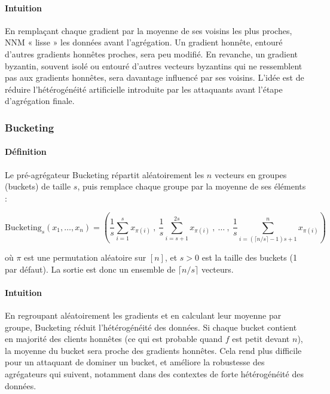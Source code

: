 \documentclass[a4paper,11pt]{article}
\begin{document}
\paragraph{Intuition}

En remplaçant chaque gradient par la moyenne de ses voisins les plus proches, NNM « lisse » les données avant l'agrégation. Un gradient honnête, entouré d'autres gradients honnêtes proches, sera peu modifié. En revanche, un gradient byzantin, souvent isolé ou entouré d'autres vecteurs byzantins qui ne ressemblent pas aux gradients honnêtes, sera davantage influencé par ses voisins. L'idée est de réduire l'hétérogénéité artificielle introduite par les attaquants avant l'étape d'agrégation finale.

\subsubsection{Bucketing}

\paragraph{Définition}

Le pré-agrégateur Bucketing répartit aléatoirement les $n$ vecteurs en groupes (buckets) de taille $s$, puis remplace chaque groupe par la moyenne de ses éléments :

\[
\mathrm{Bucketing}_s(x_1,\dots,x_n)
=
\left(
\frac{1}{s}\sum_{i=1}^s x_{\pi(i)}
\ , \
\frac{1}{s}\sum_{i=s+1}^{2s} x_{\pi(i)}
\ , \ \dots \ , \
\frac{1}{s}\sum_{i=\left(\lceil n/s \rceil-1\right)s+1}^{n} x_{\pi(i)}
\right)
\]

où $\pi$ est une permutation aléatoire sur $[n]$, et $s > 0$ est la taille des buckets (1 par défaut). La sortie est donc un ensemble de $\lceil n/s \rceil$ vecteurs.

\paragraph{Intuition}

En regroupant aléatoirement les gradients et en calculant leur moyenne par groupe, Bucketing réduit l'hétérogénéité des données. Si chaque bucket contient en majorité des clients honnêtes (ce qui est probable quand $f$ est petit devant $n$), la moyenne du bucket sera proche des gradients honnêtes. Cela rend plus difficile pour un attaquant de dominer un bucket, et améliore la robustesse des agrégateurs qui suivent, notamment dans des contextes de forte hétérogénéité des données.
\end{document}
